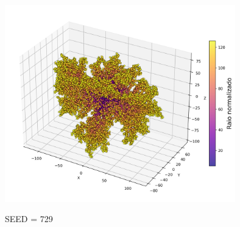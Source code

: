\documentclass[a4paper, 11pt]{tufte-handout}
\begin{document}
\begin{marginfigure}
  \centering
  \includegraphics[width=0.75\textwidth]{tarefa-3/DLA_3D-grafico-3.png}
  \caption{SEED = 729}
  \label{fig:dla_3d_seed3}
\end{marginfigure}
\end{document}
